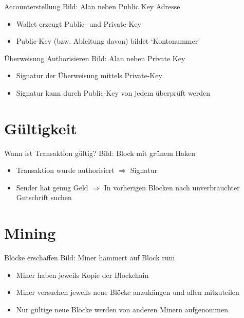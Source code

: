 \documentclass[aspectratio=169]{beamer}
\begin{document}
\begin{frame}{Accounterstellung}
    Bild: Alan neben Public Key Adresse
    \begin{itemize}
        \item Wallet erzeugt Public- und Private-Key
        \item Public-Key (bzw. Ableitung davon) bildet `Kontonummer'
    \end{itemize}
\end{frame}


\begin{frame}{Überweisung Authorisieren}
    Bild: Alan neben Private Key
    \begin{itemize}
        \item Signatur der Überweisung mittels Private-Key
        \item Signatur kann durch Public-Key von jedem überprüft werden
    \end{itemize}
\end{frame}





\section{Gültigkeit}

\begin{frame}{Wann ist Transaktion gültig?}
    Bild: Block mit grünem Haken
    \begin{itemize}
        \item Transaktion wurde authorisiert $\Rightarrow$ Signatur
        \item Sender hat genug Geld $\Rightarrow$ In vorherigen Blöcken nach unverbrauchter Gutschrift suchen
    \end{itemize}
\end{frame}





\section{Mining}

\begin{frame}{Blöcke erschaffen}
    Bild: Miner hämmert auf Block rum
    \begin{itemize}
        \item Miner haben jeweils Kopie der Blockchain
        \item Miner versuchen jeweils neue Blöcke anzuhängen und allen mitzuteilen
        \item Nur gültige neue Blöcke werden von anderen Minern aufgenommen
    \end{itemize}
\end{frame}
\end{document}

